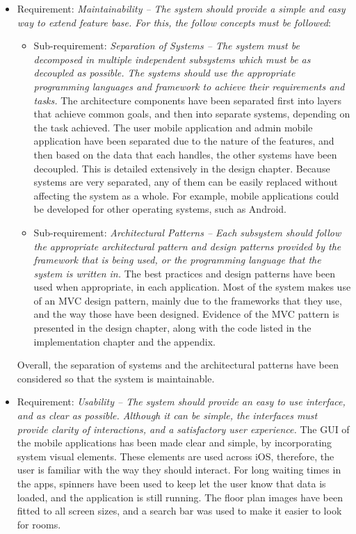 \begin{itemize}
    \item Requirement: \textit{Maintainability – The system should provide a simple and easy way to extend feature base. For this, the follow concepts must be followed}:
        \begin{itemize}
            \item Sub-requirement: \textit{Separation of Systems – The system must be decomposed in multiple independent subsystems which must be as decoupled as possible. The systems should use the appropriate programming languages and framework to achieve their requirements and tasks.}
            \newline\newline
            The architecture components have been separated first into layers that achieve common goals, and then into separate systems, depending on the task achieved. The user mobile application and admin mobile application have been separated due to the nature of the features, and then based on the data that each handles, the other systems have been decoupled. This is detailed extensively in the design chapter. Because systems are very separated, any of them can be easily replaced without affecting the system as a whole. For example, mobile applications could be developed for other operating systems, such as Android.
            \item Sub-requirement: \textit{Architectural Patterns – Each subsystem should follow the appropriate architectural pattern and design patterns provided by the framework that is being used, or the programming language that the system is written in.}
            \newline\newline
            The best practices and design patterns have been used when appropriate, in each application. Most of the system makes use of an MVC design pattern, mainly due to the frameworks that they use, and the way those have been designed. Evidence of the MVC pattern is presented in the design chapter, along with the code listed in the implementation chapter and the appendix.
        \end{itemize}
        Overall, the separation of systems and the architectural patterns have been considered so that the system is maintainable.
    \item Requirement: \textit{Usability – The system should provide an easy to use interface, and as clear as possible. Although it can be simple, the interfaces must provide clarity of interactions, and a satisfactory user experience.}
    \newline\newline
    The GUI of the mobile applications has been made clear and simple, by incorporating system visual elements. These elements are used across iOS, therefore, the user is familiar with the way they should interact. For long waiting times in the apps, spinners have been used to keep let the user know that data is loaded, and the application is still running. The floor plan images have been fitted to all screen sizes, and a search bar was used to make it easier to look for rooms.  
\end{itemize}


